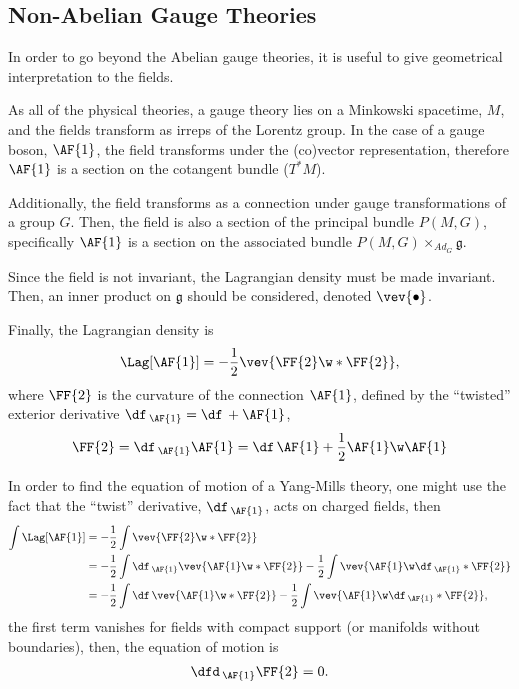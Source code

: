 \subsection{Non-Abelian Gauge Theories}

In order to go beyond the Abelian gauge theories, it is useful to give geometrical interpretation to the fields.

As all of the physical theories, a gauge theory lies on a Minkowski spacetime, $M$, and the fields transform as irreps of the Lorentz group. In the case of a gauge boson,  $\AF{1}$, the field transforms under the (co)vector representation, therefore $\AF{1}$ is a section on the cotangent bundle ($T^*M$).

Additionally, the field transforms as a connection under gauge transformations of a group $G$. Then, the field is also a section of the principal bundle $P(M,G)$, specifically $\AF{1}$ is a section on the associated bundle $P(M,G)\times_{Ad_G}\mathfrak{g}$.

Since the field is not invariant, the Lagrangian density must be made invariant. Then, an inner product on $\mathfrak{g}$ should be considered, denoted $\vev{\bullet}$.

Finally, the Lagrangian density is
\begin{align}
  \Lag[\AF{1}] =-\frac{1}{2} \vev{\FF{2}\w*\FF{2}},
\end{align}
where $\FF{2}$ is the curvature of the connection $\AF{1}$, defined by the ``twisted'' exterior derivative $\df\,_{\AF{1}}= \df\, +\AF{1}$,
\begin{align}
  \FF{2}= \df\,_{\AF{1}}\AF{1}= \df\,\AF{1} +\frac{1}{2}\AF{1}\w\AF{1}
\end{align}


\begin{WEbox}[%
    frametitle={Equations of Motion for Yang-Mills Theories},
    frametitlerule=true,
    frametitlealignment=\centering,
    frametitleaboveskip=10pt,]
  In order to find the equation of motion of a Yang-Mills theory, one might use the fact that the ``twist'' derivative, $\df\,_{\AF{1}}$, acts on charged fields, then
  \begin{align*}
    \int \Lag[\AF{1}] &=-\frac{1}{2}\int \vev{\FF{2}\w*\FF{2}}\\
    &=-\frac{1}{2}\int \df\,_{\AF{1}}\vev{\AF{1}\w*\FF{2}}-\frac{1}{2}\int \vev{\AF{1}\w\df\,_{\AF{1}}*\FF{2}}\\
    &=-\frac{1}{2}\int \df\,\vev{\AF{1}\w*\FF{2}}-\frac{1}{2}\int \vev{\AF{1}\w\df\,_{\AF{1}}*\FF{2}},
  \end{align*}
  the first term vanishes for fields with compact support (or manifolds without boundaries), then, the equation of motion is 
  \begin{align*}
    \dfd\,_{\AF{1}}\FF{2} =0.
  \end{align*}
\end{WEbox}





